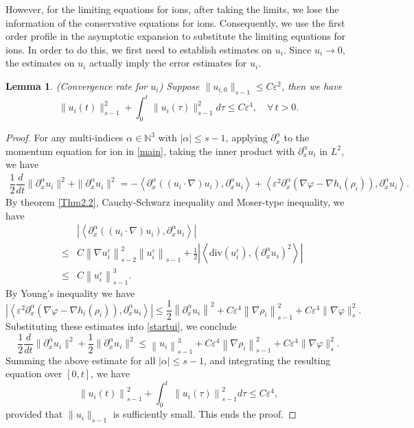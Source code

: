 \documentclass[reqno,twoside,12pt,a4paper]{amsart}
\newcommand{\eps}{\mathbb{\varepsilon}}
\newcommand{\al}{\alpha}
\newcommand{\dive}{\mathrm{div}}
\newcommand{\pa}{\partial}
\newcommand{\D}{\nabla}
\newcommand{\vp}{\varphi}
\newtheorem{lemma}{Lemma}[section]
\numberwithin{equation}{section}
\begin{document}
However, for the limiting equations for ions, after taking the limits, we lose the information of the conservative equations for ions. Consequently, we use the first order profile in the asymptotic expansion to substitute the limiting equations for ions. In order to do this, we first need to establish estimates on $u_i$. Since $u_i\to 0$, the estimates on $u_i$ actually imply  the error estimates for $u_i$. 

\begin{lemma}\label{convu}(Convergence rate for $u_i$)\label{u_i} Suppose $\|u_{i,0}\|_{s-1}\leq C\eps^2$, then we have
\begin{equation}\label{finalpre2} 
    \|u_i(t)\|_{s-1}^2+\int_0^t\|u_i(\tau)\|_{s-1}^2d\tau\leq C\eps^4, \quad \forall\,t>0.
\end{equation}
\end{lemma}

\begin{proof}
For any multi-indices $\alpha \in \mathbb{N}^3$ with $\left |\alpha \right| \leq s-1$, applying $\pa_x^\al$ to the momentum equation for ion in \eqref{main}, taking the inner product with $\pa_x^\al u_i$ in $L^2$, we have
\begin{eqnarray}\label{startui}
\dfrac{1}{2}\dfrac{d}{dt}\|\pa_x^\al u_i\|^2+\|\pa_x^\al u_i\|^2=-\left<\pa_x^\al\left((u_i\cdot \nabla)u_i\right),\pa_x^\al u_i\right>+\left<\eps^2\pa_x^\al (\D\vp-\nabla h_i(\rho_i)),\pa_x^\al u_i\right>.
\end{eqnarray}
By theorem \ref{Thm2.2}, Cauchy-Schwarz inequality and Moser-type inequality, we have
\begin{eqnarray*}
    &&\left|\left< \pa_x^\al\left( (u_i\cdot \nabla)u_i\right ) ,\pa_x^\al u_i\right>\right|\\ 
    &\leq &  C \left\|\nabla u_i^\eps \right\|^2_{s-2} \left\|u_i^\eps \right\|_{s-1}+
    \frac{1}{2} \left|\left\langle \dive(u_i^\eps), (\partial^\al_x u_i)^2 \right\rangle\right|\\
    &\leq & C \left\|u_i^\eps\right\|^3_{s-1}.
\end{eqnarray*}
By Young's inequality we have 
\begin{equation*}
   \left|\left<\eps^2\pa_x^\al (\D\vp-\nabla h_i(\rho_i)),\pa_x^\al u_i\right>\right|\leq \frac{1}{2} \left \| \pa_x^\al u_i \right \|^2+C\eps^4 \left \| \D\rho_i \right \|_{s-1}^2+C\eps^4\|\D\vp\|_s^2.
\end{equation*}
Substituting these estimates into \eqref{startui}, we conclude
\[
\dfrac{1}{2}\dfrac{d}{dt}\|\pa_x^\al u_i\|^2+\dfrac{1}{2}\|\pa_x^\al u_i\|^2\leq \left\|u_i\right\|^3_{s-1}+C\eps^4 \left \| \D\rho_i \right \|_{s-1}^2+C\eps^4\|\D\vp\|_s^2.
\]
Summing the above estimate for all $|\al|\leq s-1$, and integrating the resulting equation over $[0,t]$, we have
\begin{equation*}
    \left \| u_i(t) \right \|_{s-1}^{2}+\int_{0}^{t} \, \left \| u_i(\tau) \right \|_{s-1}^{2}d\tau \leq C\eps^4,
\end{equation*}
provided that $\|u_i\|_{s-1}$ is sufficiently small. This ends the proof. 
\end{proof}
\end{document}
